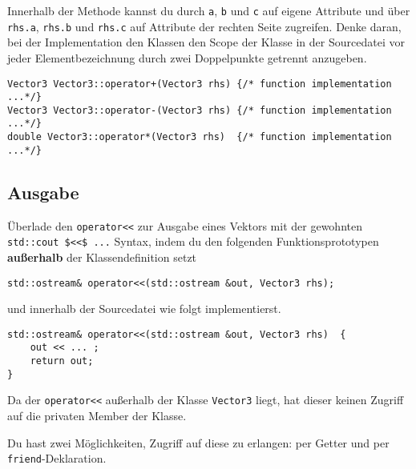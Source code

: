 Innerhalb der Methode kannst du durch \lstinline{a}, \lstinline{b} und \lstinline{c} auf eigene Attribute und über  \lstinline{rhs.a}, \lstinline{rhs.b} und \lstinline{rhs.c} auf Attribute der rechten Seite zugreifen.
Denke daran, bei der Implementation den Klassen den Scope der Klasse in der Sourcedatei vor jeder Elementbezeichnung durch zwei Doppelpunkte getrennt anzugeben.

\begin{lstlisting}
Vector3 Vector3::operator+(Vector3 rhs) {/* function implementation ...*/}
Vector3 Vector3::operator-(Vector3 rhs) {/* function implementation ...*/}
double Vector3::operator*(Vector3 rhs)  {/* function implementation ...*/}
\end{lstlisting}


\subsection{Ausgabe}
Überlade den \lstinline{operator<<} zur Ausgabe eines Vektors mit der gewohnten \lstinline{std::cout $<<$ ...} Syntax, indem du den folgenden Funktionsprototypen \textbf{außerhalb} der Klassendefinition setzt

\begin{lstlisting}
std::ostream& operator<<(std::ostream &out, Vector3 rhs);
\end{lstlisting}

und innerhalb der Sourcedatei wie folgt implementierst.

\begin{lstlisting}
std::ostream& operator<<(std::ostream &out, Vector3 rhs)  {
	out << ... ;
	return out;
}
\end{lstlisting}

Da der \lstinline{operator<<} außerhalb der Klasse \lstinline{Vector3} liegt, hat dieser keinen Zugriff auf die privaten Member der Klasse.

Du hast zwei Möglichkeiten, Zugriff auf diese zu erlangen: per Getter und per \lstinline{friend}-Deklaration.

